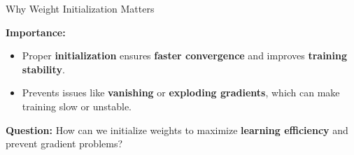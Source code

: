 \documentclass[serif, aspectratio=169]{beamer}
\begin{document}
\begin{frame}{Why Weight Initialization Matters}

    
    \textbf{Importance:}
    \begin{itemize}
        \item Proper \textbf{initialization} ensures \textbf{faster convergence} and improves  \textbf{training stability}.
        \item Prevents issues like \textbf{vanishing} or \textbf{exploding gradients}, which can make training slow or unstable.
    \end{itemize}
    
    \textbf{Question:} How can we initialize weights to maximize \textbf{learning efficiency} and prevent gradient problems?
    
\end{frame}
\end{document}
